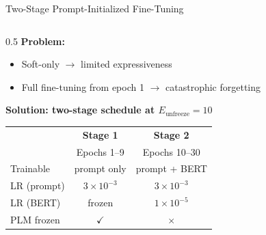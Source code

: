 \documentclass[aspectratio=169,10pt]{beamer}
\newcommand{\cmark}{\textcolor{dkgreen}{$\checkmark$}}
\newcommand{\xmark}{\textcolor{dkred}{$\times$}}
\begin{document}
\begin{frame}{Two-Stage Prompt-Initialized Fine-Tuning}
  \begin{columns}[T]
    \begin{column}{0.5\textwidth}
      \textbf{Problem:}
      \begin{itemize}
        \item Soft-only $\to$ limited expressiveness
        \item Full fine-tuning from epoch 1 $\to$ catastrophic forgetting
      \end{itemize}

      \vspace{0.4em}
      \textbf{Solution: two-stage schedule at $E_{\text{unfreeze}}=10$}

      \vspace{0.4em}
      \small
      \setlength{\tabcolsep}{4pt}
      \renewcommand{\arraystretch}{1.3}
      \begin{tabular}{l|cc}
        \toprule
        & \textbf{Stage 1} & \textbf{Stage 2} \\
        & Epochs 1--9 & Epochs 10--30 \\
        \midrule
        Trainable & prompt only & prompt + BERT \\
        LR (prompt) & $3\times10^{-3}$ & $3\times10^{-3}$ \\
        LR (BERT) & frozen & $1\times10^{-5}$ \\
        PLM frozen & \cmark & \xmark \\
        \bottomrule
      \end{tabular}


\end{column}
\end{columns}
\end{frame}
\end{document}
